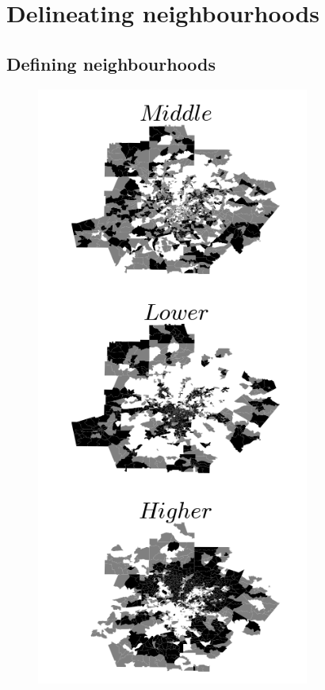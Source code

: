 \section{Delineating neighbourhoods}
\label{sec:neighbourhoods}

\subsection{Defining neighbourhoods}
\label{sub:defining_neighbourhoods}

\begin{figure}[!h]
    \centering
    \includegraphics[width=0.8\textwidth]{./gfx/chapter-segregation/figure2.png}

\end{figure}
